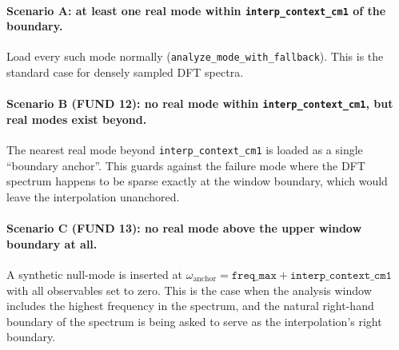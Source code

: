 \documentclass[10pt,a4paper,twoside]{article}
\newcommand{\fn}[1]{\texttt{#1}}
\newcommand{\cfgkey}[1]{\texttt{#1}}
\begin{document}
\paragraph{Scenario A: at least one real mode within \cfgkey{interp\_context\_cm1} of the boundary.}
Load every such mode normally (\fn{analyze\_mode\_with\_fallback}).
This is the standard case for densely sampled DFT spectra.

\paragraph{Scenario B (FUND 12): no real mode within
\cfgkey{interp\_context\_cm1}, but real modes exist beyond.}
The nearest real mode beyond \cfgkey{interp\_context\_cm1} is loaded
as a single ``boundary anchor''. This guards against the failure mode
where the DFT spectrum happens to be sparse exactly at the window
boundary, which would leave the interpolation unanchored.

\paragraph{Scenario C (FUND 13): no real mode above the upper window
boundary at all.}
A synthetic null-mode is inserted at
$\omega_\text{anchor} = \cfgkey{freq\_max} + \cfgkey{interp\_context\_cm1}$
with all observables set to zero. This is the case when the
analysis window includes the highest frequency in the spectrum, and
the natural right-hand boundary of the spectrum is being asked to
serve as the interpolation's right boundary.
\end{document}
